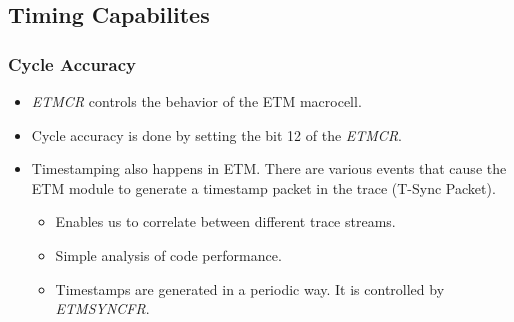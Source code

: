 \documentclass{beamer}
\begin{document}
\subsection{Timing Capabilites}
\begin{frame}
    \frametitle{Cycle Accuracy}
        \begin{itemize}
        \item \textit{ETMCR} controls the behavior of the ETM macrocell.
        \item Cycle accuracy is done by setting the bit 12 of the \textit{ETMCR}.
        \item Timestamping also happens in ETM. There are various events that
            cause the ETM module to generate a timestamp packet in the trace
            (T-Sync Packet).
            \begin{itemize}
                \item Enables us to correlate between different trace streams.
                \item Simple analysis of code performance.
                \item Timestamps are generated in a periodic way.
                    It is controlled by \textit{ETMSYNCFR}.
            \end{itemize}
    \end{itemize}
\end{frame}
\end{document}
